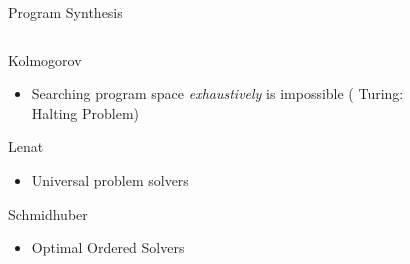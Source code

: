 \documentclass[aspectratio=169]{beamer}
\makeatletter
\renewcommand{\emph}[1]{{\Huge \color{pureminimalistic@text@red} #1}}
\newcommand{\white}[1]{{\color{pureminimalistic@text@white} #1}}
\newcommand{\cc}[1]{{\color{c3} #1}}
\makeatother
\begin{document}
\begin{frame}[plain]{\white{Program Synthesis}}
  \begin{columns}[T]
      \begin{column}{.5\linewidth}
          \vspace{1em}
          \emph{Kolmogorov}
          \newline
          \begin{itemize}
              \item Searching program space \textit{exhaustively} is impossible (\cc{Turing:} Halting Problem)
          \end{itemize}
          \emph{Lenat}
          \newline
          \begin{itemize}
              \item Universal problem solvers
          \end{itemize}
          \emph{Schmidhuber}
          \newline
          \begin{itemize}
              \item Optimal Ordered Solvers
          \end{itemize}
      \end{column}
      \begin{column}{.5\linewidth}
          \begin{figure}
              \vspace{-3.5em}
              \hspace*{1.3em}

\end{figure}
\end{column}
\end{columns}
\end{frame}
\end{document}
